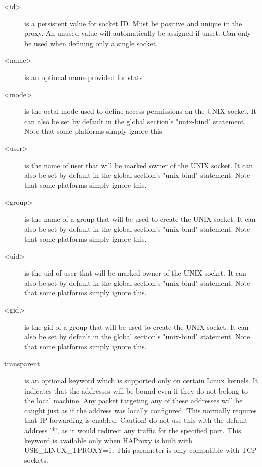 \begin{description}
  \item[<id>]          is a persistent value for socket ID. Must be positive and
                  unique in the proxy. An unused value will automatically be
                  assigned if unset. Can only be used when defining only a
                  single socket.

  \item[<name>]        is an optional name provided for stats

  \item[<mode>]        is the octal mode used to define access permissions on the
                  UNIX socket. It can also be set by default in the global
                  section's "unix-bind" statement. Note that some platforms
                  simply ignore this.

  \item[<user>]        is the name of user that will be marked owner of the UNIX
                  socket.  It can also be set by default in the global
                  section's "unix-bind" statement. Note that some platforms
                  simply ignore this.

  \item[<group>]       is the name of a group that will be used to create the UNIX
                  socket. It can also be set by default in the global section's
                  "unix-bind" statement. Note that some platforms simply ignore
                  this.

  \item[<uid>]         is the uid of user that will be marked owner of the UNIX
                  socket. It can also be set by default in the global section's
                  "unix-bind" statement. Note that some platforms simply ignore
                  this.

  \item[<gid>]         is the gid of a group that will be used to create the UNIX
                  socket. It can also be set by default in the global section's
                  "unix-bind" statement. Note that some platforms simply ignore
                  this.

  \item[transparent]   is an optional keyword which is supported only on certain
                  Linux kernels. It indicates that the addresses will be bound
                  even if they do not belong to the local machine. Any packet
                  targeting any of these addresses will be caught just as if
                  the address was locally configured. This normally requires
                  that IP forwarding is enabled. Caution! do not use this with
                  the default address '*', as it would redirect any traffic for
                  the specified port. This keyword is available only when
                  HAProxy is built with USE\_LINUX\_TPROXY=1. This parameter is
                  only compatible with TCP sockets.


\end{description}
